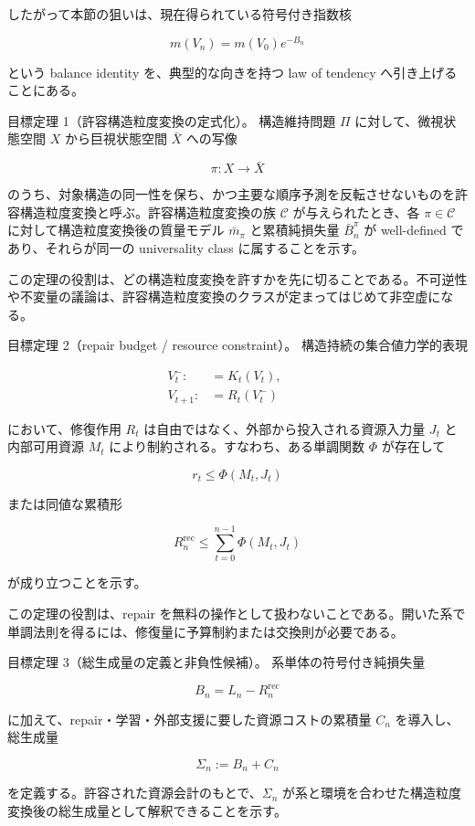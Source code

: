 \documentclass[12pt,a4paper]{article}
\begin{document}
したがって本節の狙いは、現在得られている符号付き指数核

\[
m(V_{n}) = m(V_0) e^{-B_{n}}
\]

という balance identity を、典型的な向きを持つ law of tendency へ引き上げることにある。

目標定理 1（許容構造粒度変換の定式化）。 構造維持問題 \(\Pi\) に対して、微視状態空間 \(X\) から巨視状態空間 \(\bar X\) への写像

\[
\pi : X \to \bar X
\]

のうち、対象構造の同一性を保ち、かつ主要な順序予測を反転させないものを許容構造粒度変換と呼ぶ。許容構造粒度変換の族 \(\mathcal C\) が与えられたとき、各 \(\pi \in \mathcal C\) に対して構造粒度変換後の質量モデル \(\bar m_\pi\) と累積純損失量 \(\bar B_{n}^\pi\) が well-defined であり、それらが同一の universality class に属することを示す。

この定理の役割は、どの構造粒度変換を許すかを先に切ることである。不可逆性や不変量の議論は、許容構造粒度変換のクラスが定まってはじめて非空虚になる。

目標定理 2（repair budget / resource constraint）。 構造持続の集合値力学的表現

\[
\begin{aligned}
V_{t}^- :&= K_{t}(V_{t}), \qquad \\
V_{t+1} :&= R_{t}(V_{t}^-)
\end{aligned}
\]

において、修復作用 \(R_{t}\) は自由ではなく、外部から投入される資源入力量 \(J_{t}\) と内部可用資源 \(M_{t}\) により制約される。すなわち、ある単調関数 \(\Phi\) が存在して

\[
r_{t} \le \Phi(M_{t}, J_{t})
\]

または同値な累積形

\[
R_{n}^{\mathrm{rec}} \le \sum_{t=0}^{n-1} \Phi(M_{t}, J_{t})
\]

が成り立つことを示す。

この定理の役割は、repair を無料の操作として扱わないことである。開いた系で単調法則を得るには、修復量に予算制約または交換則が必要である。

目標定理 3（総生成量の定義と非負性候補）。 系単体の符号付き純損失量

\[
B_{n} = L_{n} - R_{n}^{\mathrm{rec}}
\]

に加えて、repair・学習・外部支援に要した資源コストの累積量 \(C_{n}\) を導入し、総生成量

\[
\Sigma_{n} := B_{n} + C_{n}
\]

を定義する。許容された資源会計のもとで、\(\Sigma_{n}\) が系と環境を合わせた構造粒度変換後の総生成量として解釈できることを示す。
\end{document}
